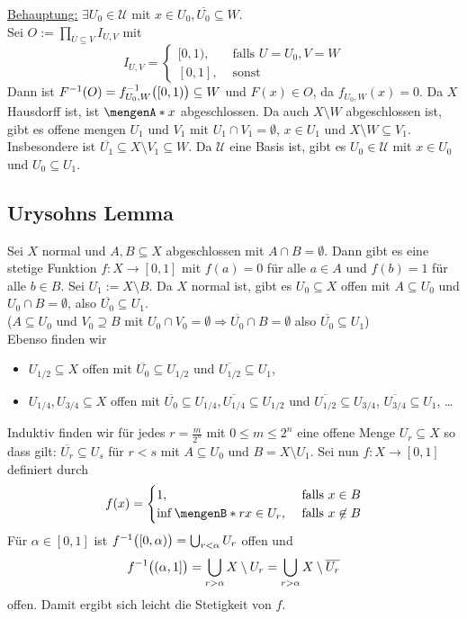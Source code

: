 \uline{Behauptung:} $\exists U_0 \in \mathcal{U}$ mit $x \in U_0, \overline{U_0} \subseteq W$.\\
Sei $O := \prod_{\overline{U} \subseteq V} I_{U,V}$ mit 
\[
	I_{U,V} = \begin{cases}
		[0,1), &\text{ falls }U=U_0, V=W\\
		[0,1], &\text{ sonst}
	\end{cases}
\]
Dann ist $F ^{-1}(O) = f ^{-1}_{U_0, W} \enbrace[\big]{[0,1)} \subseteq W$ und $F(x) \in O$, da $f_{U_0, W} (x) = 0$.
Da $X$ Hausdorff ist, ist $\set{x}$ abgeschlossen. Da auch $X \setminus W$ abgeschlossen ist, gibt es offene mengen $U_1$ und $V_1$ mit $U_1 \cap V_1 = \emptyset$, $x \in U_1$ und
$X \setminus W \subseteq V_1$. Insbesondere ist $\overline{U_1} \subseteq X \setminus V_1 \subseteq W $. Da $\mathcal{U}$ eine Basis ist, gibt es $U_0 \in \mathcal{U}$ mit 
$x \in U_0$ und $U_0 \subseteq U_1$. \bewende

\subsection{Urysohns Lemma} %
\label{sub:74}
Sei $X$ normal und $A,B \subseteq X$ abgeschlossen mit $A \cap B = \emptyset$. Dann gibt es eine stetige Funktion $f : X \to [0,1]$ mit $f(a) = 0$ für alle $a \in A$ und
$f(b)= 1$ für alle $b \in B$.
Sei $U_1 := X \setminus B$. Da $X$ normal ist, gibt es $U_0 \subseteq X$ offen mit $A \subseteq U_0$ und $U_0 \cap B = \emptyset$, also $\overline{U_0} \subseteq U_1$.\\
($A \subseteq U_0$ und $V_0 \supseteq B$ mit $U_0 \cap V_0 = \emptyset \Rightarrow \overline{U_0} \cap B = \emptyset $ also $\overline{U_0} \subseteq U_1$) \\
Ebenso finden wir 
\begin{itemize}
	\item $U_{1/2} \subseteq X$ offen mit $\overline{U_0} \subseteq U_{1/2}$ und $\overline{U_{1/2}} \subseteq U_1$,
	\item $U_{1/4}, U_{3/4} \subseteq X$ offen mit 
	$\overline{U_0} \subseteq U_{1/4}, \overline{U_{1/4}} \subseteq U_{1/2}$ und $ \overline{U_{1/2}} \subseteq U_{3/4} $, $\overline{U_{3/4}} \subseteq U_1 $, \ldots
\end{itemize}
Induktiv finden wir für jedes $r = \frac{m}{2^n} $ mit $0 \le m \le 2^n$ eine offene Menge $U_r \subseteq X$ so dass gilt: $\overline{U_r} \subseteq U_s $ für $r < s$ mit
$A \subseteq U_0$ und $B= X \setminus U_1$. Sei nun $f : X \to [0,1]$ definiert durch
\[
	f(x) = \begin{cases}
		1, &\text{ falls }x \in B\\
		\inf \set[r]{x \in U_r} , &\text{ falls } x \not\in B
	\end{cases}
\]
Für $\alpha\in [0,1]$ ist $f ^{-1}\enbrace[\big]{[0,\alpha)} = \bigcup_{r <\alpha} U_r$ offen und 
\[
	f ^{-1} \enbrace[\big]{(\alpha,1]} = \bigcup_{r > \alpha} X \setminus U_r = \bigcup_{r > \alpha} X  \setminus \overline{U_r} 
\]
offen. Damit ergibt sich leicht die Stetigkeit von $f$. \bewende
\newpage

